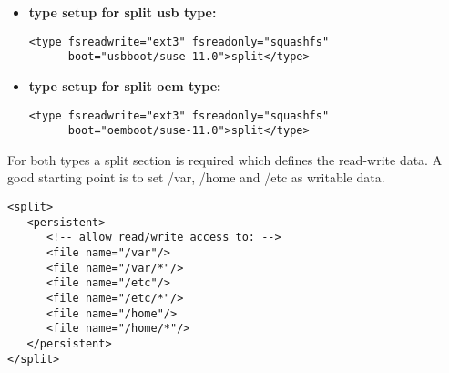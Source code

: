 \begin{itemize}
\item \textbf{type setup for split usb type:}

      \begin{Command}{12cm}
      \begin{verbatim}
<type fsreadwrite="ext3" fsreadonly="squashfs"
      boot="usbboot/suse-11.0">split</type>
      \end{verbatim}
      \end{Command}
\item \textbf{type setup for split oem type:}

      \begin{Command}{12cm}
      \begin{verbatim}
<type fsreadwrite="ext3" fsreadonly="squashfs"
      boot="oemboot/suse-11.0">split</type>
      \end{verbatim}
      \end{Command}
\end{itemize}

For both types a split section is required which defines the read-write
data. A good starting point is to set /var, /home and /etc as writable
data.

\begin{Command}{12cm}
\begin{verbatim}
<split>
   <persistent>
      <!-- allow read/write access to: -->
      <file name="/var"/>
      <file name="/var/*"/>
      <file name="/etc"/>
      <file name="/etc/*"/>
      <file name="/home"/>
      <file name="/home/*"/>
   </persistent>
</split>
\end{verbatim}
\end{Command}
